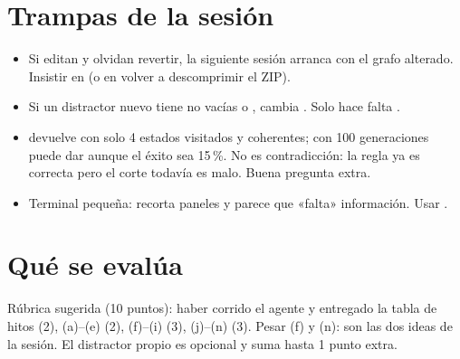 \section{Trampas de la sesión}
\begin{itemize}
\item Si editan  y olvidan revertir, la siguiente sesión arranca con el grafo alterado. Insistir en  (o en volver a descomprimir el ZIP).
\item Si un distractor nuevo tiene  no vacías o , cambia . Solo hace falta .
\item {} devuelve  con solo 4 estados visitados y coherentes; con 100 generaciones puede dar  aunque el éxito sea 15\,\%. No es contradicción: la regla ya es correcta pero el corte todavía es malo. Buena pregunta extra.
\item Terminal pequeña:  recorta paneles y parece que «falta» información. Usar .
\end{itemize}

\section{Qué se evalúa}

Rúbrica sugerida (10 puntos): haber corrido el agente y entregado la tabla de hitos (2), (a)–(e) (2), (f)–(i) (3), (j)–(n) (3). Pesar (f) y (n): son las dos ideas de la sesión. El distractor propio es opcional y suma hasta 1 punto extra.


